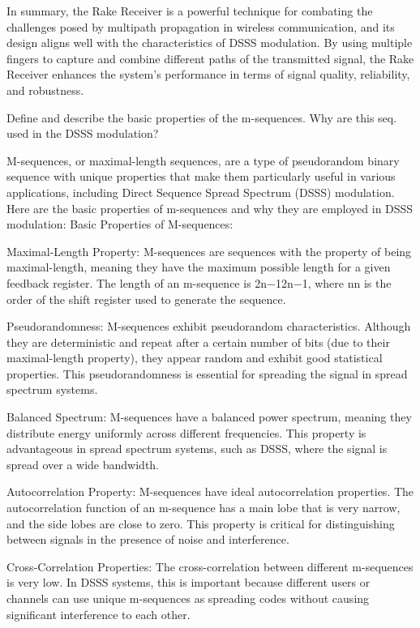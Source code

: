 In summary, the Rake Receiver is a powerful technique for combating the challenges posed by multipath propagation in wireless communication, and its design aligns well with the characteristics of DSSS modulation. By using multiple fingers to capture and combine different paths of the transmitted signal, the Rake Receiver enhances the system's performance in terms of signal quality, reliability, and robustness.




Define and describe the basic properties of the m-sequences. Why are this seq. used in the DSSS modulation?

M-sequences, or maximal-length sequences, are a type of pseudorandom binary sequence with unique properties that make them particularly useful in various applications, including Direct Sequence Spread Spectrum (DSSS) modulation. Here are the basic properties of m-sequences and why they are employed in DSSS modulation:
Basic Properties of M-sequences:

Maximal-Length Property:
M-sequences are sequences with the property of being maximal-length, meaning they have the maximum possible length for a given feedback register. The length of an m-sequence is 2n−12n−1, where nn is the order of the shift register used to generate the sequence.

Pseudorandomness:
M-sequences exhibit pseudorandom characteristics. Although they are deterministic and repeat after a certain number of bits (due to their maximal-length property), they appear random and exhibit good statistical properties. This pseudorandomness is essential for spreading the signal in spread spectrum systems.

Balanced Spectrum:
M-sequences have a balanced power spectrum, meaning they distribute energy uniformly across different frequencies. This property is advantageous in spread spectrum systems, such as DSSS, where the signal is spread over a wide bandwidth.

Autocorrelation Property:
M-sequences have ideal autocorrelation properties. The autocorrelation function of an m-sequence has a main lobe that is very narrow, and the side lobes are close to zero. This property is critical for distinguishing between signals in the presence of noise and interference.

Cross-Correlation Properties:
The cross-correlation between different m-sequences is very low. In DSSS systems, this is important because different users or channels can use unique m-sequences as spreading codes without causing significant interference to each other.

